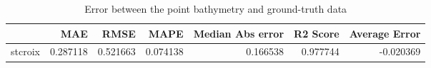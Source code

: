 \begin{table}[h!]
\caption{Error between the point bathymetry and ground-truth data}
\label{tab:stcroix_lidar_error}
\begin{tabular}{lrrrrrr}
\toprule
 & MAE & RMSE & MAPE & Median Abs error & R2 Score & Average Error \\
\midrule
stcroix & 0.287118 & 0.521663 & 0.074138 & 0.166538 & 0.977744 & -0.020369 \\
\bottomrule
\end{tabular}
\end{table}
